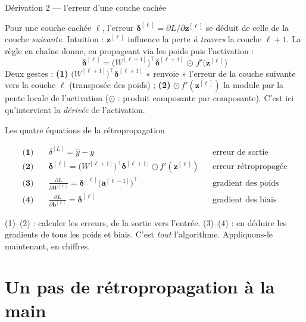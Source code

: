 \documentclass[aspectratio=169,11pt]{beamer}
\newcommand{\va}{\mathbf{a}}
\newcommand{\vz}{\mathbf{z}}
\newcommand{\vb}{\mathbf{b}}
\newcommand{\vd}{\boldsymbol{\delta}}
\begin{document}
\begin{frame}{Dérivation 2 — l'erreur d'une couche cachée}
\begin{ucadex}
{\small Pour une couche cachée $\ell$, l'erreur $\vd^{[\ell]} = \partial L / \partial \vz^{[\ell]}$ se déduit de celle de la couche \emph{suivante}. Intuition : $\vz^{[\ell]}$ influence la perte \emph{à travers} la couche $\ell+1$. La règle en chaîne donne, en propageant via les poids puis l'activation :
\[ \boxed{\;\vd^{[\ell]} = \big(W^{[\ell+1]}\big)^\top \vd^{[\ell+1]} \,\odot\, f'\!\big(\vz^{[\ell]}\big)\;} \]
Deux gestes : \textbf{(1)} $\big(W^{[\ell+1]}\big)^\top \vd^{[\ell+1]}$ « renvoie » l'erreur de la couche suivante vers la couche $\ell$ (transposée des poids) ; \textbf{(2)} $\odot\, f'(\vz^{[\ell]})$ la module par la pente locale de l'activation ($\odot$ : produit composante par composante). C'est ici qu'intervient la \emph{dérivée} de l'activation.}
\end{ucadex}
\end{frame}

\begin{frame}{Les quatre équations de la rétropropagation}
\begin{ucadret}
{\small \begin{align*}
\textbf{(1)}\quad & \delta^{[L]} = \hat y - y && \text{erreur de sortie}\\[2pt]
\textbf{(2)}\quad & \vd^{[\ell]} = \big(W^{[\ell+1]}\big)^\top \vd^{[\ell+1]} \odot f'(\vz^{[\ell]}) && \text{erreur rétropropagée}\\[2pt]
\textbf{(3)}\quad & \frac{\partial L}{\partial W^{[\ell]}} = \vd^{[\ell]} \big(\va^{[\ell-1]}\big)^\top && \text{gradient des poids}\\[2pt]
\textbf{(4)}\quad & \frac{\partial L}{\partial \vb^{[\ell]}} = \vd^{[\ell]} && \text{gradient des biais}
\end{align*}}
\end{ucadret}
{\small (1)–(2) : calculer les erreurs, de la sortie vers l'entrée. (3)–(4) : en déduire les gradients de tous les poids et biais. C'est \emph{tout} l'algorithme. Appliquons-le maintenant, en chiffres.}
\end{frame}

\section{Un pas de rétropropagation à la main}
\end{document}
